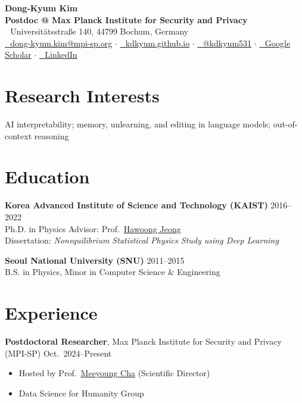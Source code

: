 \documentclass[11pt,letterpaper]{article}
\newcommand{\scholaricon}{\faGraduationCap}
\newcommand{\scholaricon}{\aiGoogleScholar}
\begin{document}
\begin{center}
    {\LARGE \textbf{Dong-Kyum Kim}} \\[4pt]
    \textbf{Postdoc @ Max Planck Institute for Security and Privacy} \\[4pt]
    {\small \faMapMarker\,\, Universit\"atsstra\ss e 140, 44799 Bochum, Germany} \\[5pt]
    \href{mailto:dong-kyum.kim@mpi-sp.org}{\faEnvelope\,\, dong-kyum.kim@mpi-sp.org} $\cdot$
    \href{https://kdkyum.github.io}{\faGlobe\,\, kdkyum.github.io} $\cdot$
    \href{https://x.com/kdkyum531}{\faTwitter\,\, @kdkyum531} $\cdot$
    \href{https://scholar.google.com/citations?user=-pvD9xUAAAAJ}{\scholaricon\,\, Google Scholar} $\cdot$
    \href{https://www.linkedin.com/in/kdkyum}{\faLinkedin\,\, LinkedIn}
\end{center}

\section{Research Interests}
\noindent AI interpretability; memory, unlearning, and editing in language models; out-of-context reasoning

\section{Education}
\noindent\textbf{Korea Advanced Institute of Science and Technology (KAIST)} \hfill 2016--2022 \\
Ph.D. in Physics \hfill Advisor: Prof.\ \href{https://stat.kaist.ac.kr:2583/~hjeong/}{Hawoong Jeong} \\
{\small Dissertation: \textit{Nonequilibrium Statistical Physics Study using Deep Learning}}

\vspace{4pt}
\noindent\textbf{Seoul National University (SNU)} \hfill 2011--2015 \\
B.S. in Physics, Minor in Computer Science \& Engineering

\section{Experience}

\noindent\textbf{Postdoctoral Researcher}, Max Planck Institute for Security and Privacy (MPI-SP) \hfill Oct.\
2024--Present
\begin{itemize}
    \item Hosted by Prof.\ \href{https://www.linkedin.com/in/miacha/}{Meeyoung Cha} (Scientific Director)
    \item Data Science for Humanity Group
\end{itemize}
\end{document}
